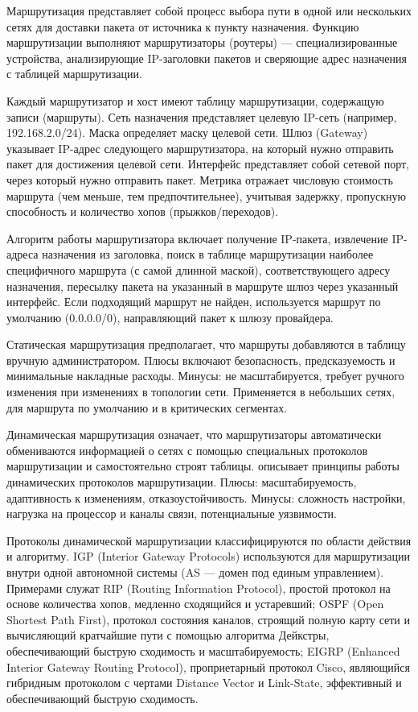 \documentclass{SibFU-docs}
\begin{document}

Маршрутизация представляет собой процесс выбора пути в одной или нескольких сетях для доставки пакета от источника к пункту назначения. Функцию маршрутизации выполняют маршрутизаторы (роутеры) --- специализированные устройства, анализирующие IP-заголовки пакетов и сверяющие адрес назначения с таблицей маршрутизации.


Каждый маршрутизатор и хост имеют таблицу маршрутизации, содержащую записи (маршруты). Сеть назначения представляет целевую IP-сеть (например, 192.168.2.0/24). Маска определяет маску целевой сети. Шлюз (Gateway) указывает IP-адрес следующего маршрутизатора, на который нужно отправить пакет для достижения целевой сети. Интерфейс представляет собой сетевой порт, через который нужно отправить пакет. Метрика отражает числовую стоимость маршрута (чем меньше, тем предпочтительнее), учитывая задержку, пропускную способность и количество хопов (прыжков/переходов).

Алгоритм работы маршрутизатора включает получение IP-пакета, извлечение IP-адреса назначения из заголовка, поиск в таблице маршрутизации наиболее специфичного маршрута (с самой длинной маской), соответствующего адресу назначения, пересылку пакета на указанный в маршруте шлюз через указанный интерфейс. Если подходящий маршрут не найден, используется маршрут по умолчанию (0.0.0.0/0), направляющий пакет к шлюзу провайдера.


Статическая маршрутизация предполагает, что маршруты добавляются в таблицу вручную администратором. Плюсы включают безопасность, предсказуемость и минимальные накладные расходы. Минусы: не масштабируется, требует ручного изменения при изменениях в топологии сети. Применяется в небольших сетях, для маршрута по умолчанию и в критических сегментах.

Динамическая маршрутизация означает, что маршрутизаторы автоматически обмениваются информацией о сетях с помощью специальных протоколов маршрутизации и самостоятельно строят таблицы. \cite{huitema1995routing} описывает принципы работы динамических протоколов маршрутизации. Плюсы: масштабируемость, адаптивность к изменениям, отказоустойчивость. Минусы: сложность настройки, нагрузка на процессор и каналы связи, потенциальные уязвимости.

Протоколы динамической маршрутизации классифицируются по области действия и алгоритму. IGP (Interior Gateway Protocols) используются для маршрутизации внутри одной автономной системы (AS --- домен под единым управлением). Примерами служат RIP (Routing Information Protocol), простой протокол на основе количества хопов, медленно сходящийся и устаревший; OSPF (Open Shortest Path First), протокол состояния каналов, строящий полную карту сети и вычисляющий кратчайшие пути с помощью алгоритма Дейкстры, обеспечивающий быструю сходимость и масштабируемость; EIGRP (Enhanced Interior Gateway Routing Protocol), проприетарный протокол Cisco, являющийся гибридным протоколом с чертами Distance Vector и Link-State, эффективный и обеспечивающий быструю сходимость.
\end{document}
